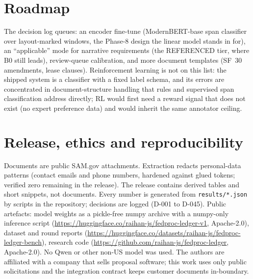 \documentclass[11pt]{article}
\begin{document}
\section{Roadmap}\label{sec:roadmap}
The decision log queues: an encoder fine-tune (ModernBERT-base span classifier over layout-marked windows, the Phase-8 design the linear model stands in for), an ``applicable'' mode for narrative requirements (the REFERENCED tier, where B0 still leads), review-queue calibration, and more document templates (SF~30 amendments, lease clauses). Reinforcement learning is not on this list: the shipped system is a classifier with a fixed label schema, and its errors are concentrated in document-structure handling that rules and supervised span classification address directly; RL would first need a reward signal that does not exist (no expert preference data) and would inherit the same annotator ceiling.

\section{Release, ethics and reproducibility}\label{sec:release}
Documents are public SAM.gov attachments. Extraction redacts personal-data patterns (contact emails and phone numbers, hardened against glued tokens; verified zero remaining in the release). The release contains derived tables and short snippets, not documents. Every number is generated from \texttt{results/*.json} by scripts in the repository; decisions are logged (D-001 to D-045). Public artefacts: model weights as a pickle-free numpy archive with a numpy-only inference script (\url{https://huggingface.co/raihan-js/fedproc-ledger-v1}, Apache-2.0), dataset and round reports (\url{https://huggingface.co/datasets/raihan-js/fedproc-ledger-bench}), research code (\url{https://github.com/raihan-js/fedproc-ledger}, Apache-2.0). No Qwen or other non-US model was used. The authors are affiliated with a company that sells proposal software; this work uses only public solicitations and the integration contract keeps customer documents in-boundary.
\end{document}
